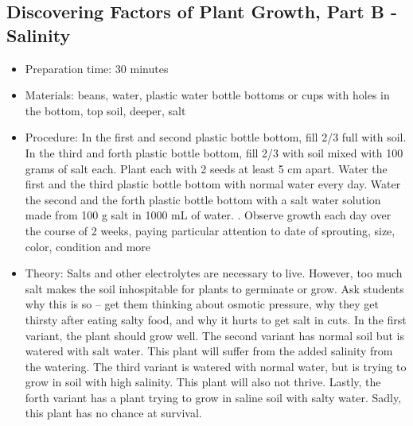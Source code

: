 \subsection{Discovering Factors of Plant Growth, Part B - Salinity}
\begin{itemize}
\item{Preparation time: 30 minutes}
\item{Materials: beans, water, plastic water bottle bottoms or cups with holes in the bottom, top soil, deeper, salt}
\item{Procedure: In the first and second plastic bottle bottom, fill 2/3 full with soil. In the third and forth plastic bottle bottom, fill 2/3 with soil mixed with 100 grams of salt each. Plant each with 2 seeds at least 5 cm apart. Water the first and the third plastic bottle bottom with normal water every day. Water the second and the forth plastic bottle bottom with a salt water solution made from 100 g salt in 1000 mL of water. . Observe growth each day over the course of 2 weeks, paying particular attention to date of sprouting, size, color, condition and more}
\item{Theory: Salts and other electrolytes are necessary to live. However, too much salt makes the soil inhospitable for plants to germinate or grow. Ask students why this is so – get them thinking about osmotic pressure, why they get thirsty after eating salty food, and why it hurts to get salt in cuts. In the first variant, the plant should grow well. The second variant has normal soil but is watered with salt water. This plant will suffer from the added salinity from the watering. The third variant is watered with normal water, but is trying to grow in soil with high salinity. This plant will also not thrive. Lastly, the forth variant has a plant trying to grow in saline soil with salty water. Sadly, this plant has no chance at survival.}
\end{itemize}

